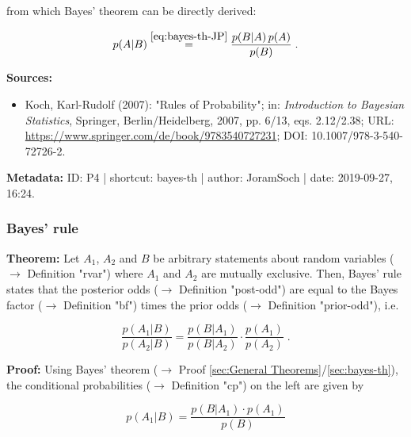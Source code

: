 \documentclass[a4paper,12pt]{book}
\begin{document}
from which Bayes' theorem can be directly derived:

\begin{equation} \label{eq:bayes-th-BT-proof}
p(A|B) \overset{\eqref{eq:bayes-th-JP}}{=} \frac{p(B|A) \, p(A)}{p(B)} \; .
\end{equation}

\vspace{1em}
\textbf{Sources:}
\begin{itemize}
\item Koch, Karl-Rudolf (2007): "Rules of Probability"; in: \textit{Introduction to Bayesian Statistics}, Springer, Berlin/Heidelberg, 2007, pp. 6/13, eqs. 2.12/2.38; URL: \url{https://www.springer.com/de/book/9783540727231}; DOI: 10.1007/978-3-540-72726-2.
\end{itemize}


\vspace{1em}
\textbf{Metadata:} ID: P4 | shortcut: bayes-th | author: JoramSoch | date: 2019-09-27, 16:24.


\subsubsection[\textbf{Bayes' rule}]{Bayes' rule} \label{sec:bayes-rule}

\vspace{1em}
\textbf{Theorem:} Let $A_1$, $A_2$ and $B$ be arbitrary statements about random variables ($\rightarrow$ Definition "rvar") where $A_1$ and $A_2$ are mutually exclusive. Then, Bayes' rule states that the posterior odds ($\rightarrow$ Definition "post-odd") are equal to the Bayes factor ($\rightarrow$ Definition "bf") times the prior odds ($\rightarrow$ Definition "prior-odd"), i.e.

\begin{equation} \label{eq:bayes-rule-bayes-rule}
\frac{p(A_1|B)}{p(A_2|B)} = \frac{p(B|A_1)}{p(B|A_2)} \cdot \frac{p(A_1)}{p(A_2)} \; .
\end{equation}


\vspace{1em}
\textbf{Proof:} Using Bayes' theorem ($\rightarrow$ Proof \ref{sec:General Theorems}/\ref{sec:bayes-th}), the conditional probabilities ($\rightarrow$ Definition "cp") on the left are given by

\begin{equation} \label{eq:bayes-rule-bayes-th-A1}
p(A_1|B) = \frac{p(B|A_1) \cdot p(A_1)}{p(B)}
\end{equation}
\end{document}
